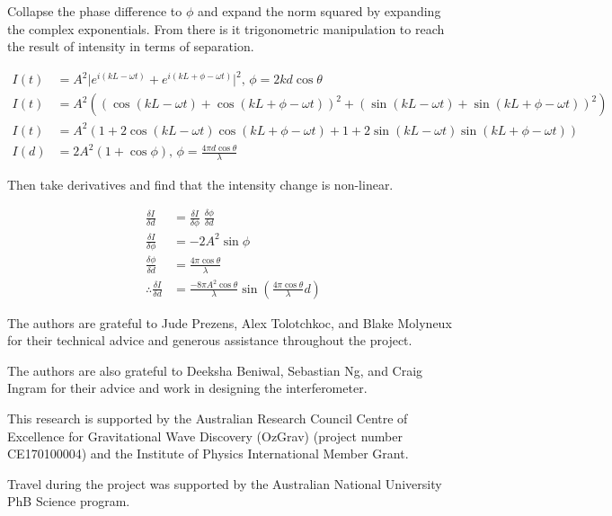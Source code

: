 \documentclass[prb,preprint]{revtex4-1}
\begin{document}
Collapse the phase difference to $\phi$ and expand the norm squared by expanding the complex exponentials. From there is it trigonometric manipulation to reach the result of intensity in terms of separation.

\begin{align}    
    I(t) &= A^2 \lvert e^{i (k L - \omega t)} + e^{i (k L + \phi - \omega t)} \rvert^2,\, \phi = 2 k d \cos{\theta} \\
    I(t) &= A^2 ((\cos{(k L - \omega t)} + \cos{(k L + \phi - \omega t)})^2 + (\sin{(k L - \omega t)} + \sin{(k L + \phi - \omega t)})^2) \\
    I(t) &= A^2 (1 + 2 \cos{(k L - \omega t)} \cos{(k L + \phi - \omega t)} + 1 + 2 \sin{(k L - \omega t)} \sin{(k L + \phi - \omega t)}) \\
    I(d) &= 2 A^2 (1 + \cos{\phi}),\, \phi = \frac{4 \pi d \cos{\theta}}{\lambda}
\end{align}

Then take derivatives and find that the intensity change is non-linear.

\begin{align}    
    \frac{\delta I}{\delta d} &= \frac{\delta I}{\delta \phi}\; \frac{\delta \phi}{\delta d}\\
    \frac{\delta I}{\delta\phi} &= - 2 A^2 \sin{\phi}\\
    \frac{\delta\phi}{\delta d} &= \frac{4 \pi \cos{\theta}}{\lambda}\\
    \therefore \frac{\delta I}{\delta d} &= \frac{- 8 \pi A^2 \cos{\theta}}{\lambda} \sin{(\frac{4 \pi \cos{\theta}}{\lambda} d)}
\end{align}


\begin{acknowledgments}
The authors are grateful to Jude Prezens, Alex Tolotchkoc, and Blake Molyneux for their technical advice and generous assistance throughout the project.
	
The authors are also grateful to Deeksha Beniwal, Sebastian Ng, and Craig Ingram for their advice and work in designing the interferometer. 

This research is supported by the Australian Research Council Centre of Excellence for Gravitational Wave Discovery (OzGrav) (project number CE170100004) and the Institute of Physics International Member Grant.

Travel during the project was supported by the Australian National University PhB Science  program.

\end{acknowledgments}




\end{document}
